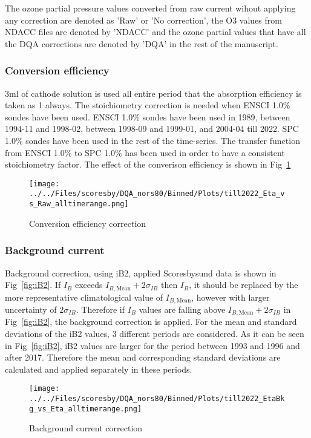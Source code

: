 The ozone partial pressure values converted from raw current
wihout applying any correction are denoted as 'Raw' or 'No correction', the O3 values from NDACC files are denoted
by 'NDACC' and the ozone partial values that have all the DQA corrections
are denoted by 'DQA' in the rest of the manuscript.


    \subsubsection{Conversion efficiency}
3ml of cathode solution is used all entire period that the absorption efficiency is taken as 1 always.
 The stoichiometry correction is needed when ENSCI 1.0\% sondes have been used.
ENSCI 1.0\% sondes have been used in 1989, between 1994-11 and 1998-02,
between 1998-09 and 1999-01, and 2004-04 till 2022. SPC 1.0\% sondes have been used in the rest of the time-series.
The transfer function from ENSCI 1.0\% to SPC 1.0\% has been used in order to have a consistent stoichiometry
factor. The effect of the converison efficiency is shown in Fig~\ref{fig:eta}


%
                \begin{figure}
        \centering
\texttt{[image: ../../Files/scoresby/DQA\_nors80/Binned/Plots/till2022\_Eta\_vs\_Raw\_alltimerange.png]}
    \caption{Conversion efficiency correction}
            \label{fig:eta}
    \end{figure}

        \subsubsection{Background current}
        Background correction, using iB2, applied Scoresbysund data is shown in Fig~\ref{fig:iB2}. If $I_B$ exceeds $I_{B,\text{Mean}}+2\sigma_{IB}$ then $I_B$, it
should be replaced by the more representative climatological value of $I_{B,\text{Mean}}$, however with
larger uncertainty of $2\sigma_{IB}$.
Therefore if $I_B$ values are falling above $I_{B,\text{Mean}}+2\sigma_{IB}$ in Fig~\ref{fig:iB2}, the background correction is applied.
For the mean and standard deviations
of the iB2 values, 3 different periods are considered.
As it can be seen in Fig~\ref{fig:iB2}, iB2 values are larger for the period between 1993 and 1996 and after 2017.
Therefore the mean and corresponding standard deviations are calculated and applied separately in these periods.
%
                \begin{figure}
        \centering
\texttt{[image: ../../Files/scoresby/DQA\_nors80/Binned/Plots/till2022\_EtaBkg\_vs\_Eta\_alltimerange.png]}
    \caption{Background current correction}
            \label{fig:bkg}
    \end{figure}
